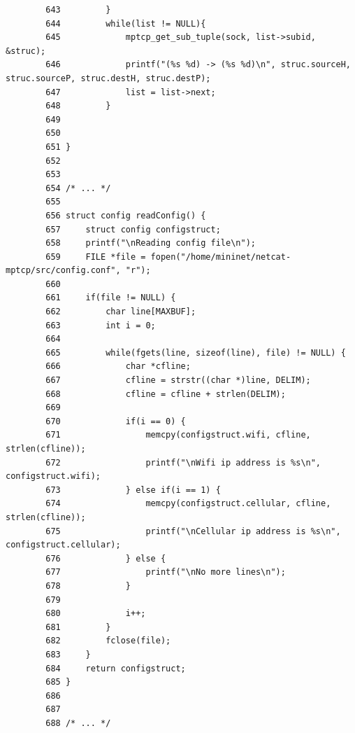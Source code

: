 \documentclass[a4paper,11pt]{article}
\begin{document}
\begin{lstlisting}
		643	        }
		644	        while(list != NULL){
		645	            mptcp_get_sub_tuple(sock, list->subid, &struc);
		646	            printf("(%s %d) -> (%s %d)\n", struc.sourceH, struc.sourceP, struc.destH, struc.destP);
		647	            list = list->next;
		648	        }
		649		
		650
		651	}
		652
		653
		654	/* ... */
		655
		656	struct config readConfig() {
		657		struct config configstruct;
		658		printf("\nReading config file\n");
		659		FILE *file = fopen("/home/mininet/netcat-mptcp/src/config.conf", "r");
		660
		661		if(file != NULL) {
		662			char line[MAXBUF];
		663			int i = 0;
		664
		665			while(fgets(line, sizeof(line), file) != NULL) {
		666				char *cfline;
		667				cfline = strstr((char *)line, DELIM);
		668				cfline = cfline + strlen(DELIM);
		669
		670				if(i == 0) {
		671					memcpy(configstruct.wifi, cfline, strlen(cfline));
		672					printf("\nWifi ip address is %s\n", configstruct.wifi);
		673				} else if(i == 1) {
		674					memcpy(configstruct.cellular, cfline, strlen(cfline));
		675					printf("\nCellular ip address is %s\n", configstruct.cellular);
		676				} else {
		677					printf("\nNo more lines\n");
		678				}
		679
		680				i++;
		681			}
		682			fclose(file);
		683		}
		684		return configstruct;
		685	}
		686
		687
		688	/* ... */
		\end{lstlisting}
\end{document}

